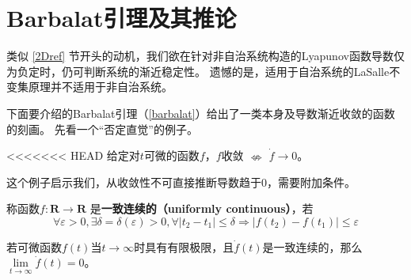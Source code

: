 \section{Barbalat引理及其推论}\label{3Eref}
类似 \ref{2Dref} 节开头的动机，我们欲在针对非自治系统构造的Lyapunov函数导数仅为负定时，仍可判断系统的渐近稳定性。
遗憾的是，适用于自治系统的LaSalle不变集原理并不适用于非自治系统。

下面要介绍的Barbalat引理（\ref{barbalat}）给出了一类本身及导数渐近收敛的函数的刻画。
先看一个“否定直觉”的例子。
\begin{example}
<<<<<<< HEAD
    给定对$t$可微的函数$f$，$f$收敛  $\nLeftrightarrow $ $\dot{f} \rightarrow 0$。
\end{example}
这个例子启示我们，从收敛性不可直接推断导数趋于$0$，需要附加条件。
\begin{definition}
    称函数$f : \mathbf{R} \rightarrow \mathbf{R}$ 是{\bf 一致连续的（uniformly continuous）}，若
     \[\forall \varepsilon > 0, \exists \delta
  = \delta (\varepsilon) > 0, \forall | t_2 - t_1 | \leq \delta \Rightarrow |
  f (t_2) - f (t_1) | \leq \varepsilon\]
\end{definition}
\begin{theorem}[Barbalat引理]\label{barbalat}
    若可微函数$f(t)$当$t\to\infty$时具有有限极限，且$\dot{f}(t)$是一致连续的，那么$\lim\limits_{t\to\infty}\dot{f}(t)=0$。
\end{theorem}
